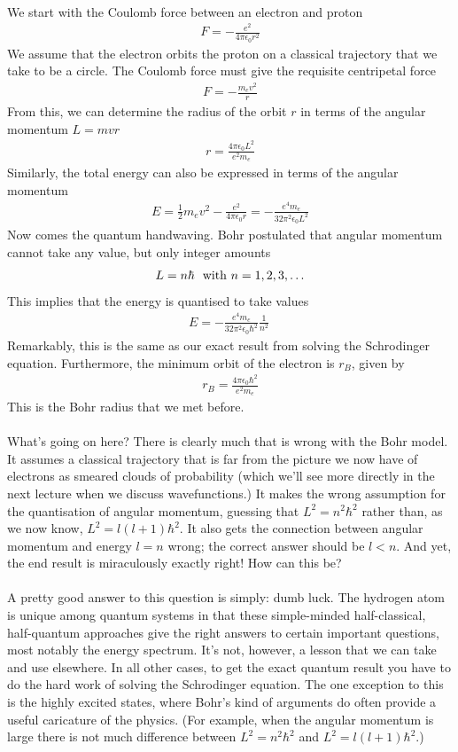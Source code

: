 \documentclass[12pt]{article}
\def\be{\begin{eqnarray}}
\def\ee{\end{eqnarray}}
\newcommand{\nn}{\nonumber}
\newcommand\para{\paragraph{}}
\newcommand{\co}{\color{olive}}
\begin{document}
{\para
{\co 
We start with the Coulomb force between an electron and proton
%
\be F = -\frac{e^2}{4\pi\epsilon_0 r^2}\nn\ee
%
}
We assume that the electron orbits the proton on a classical trajectory that we take to be a circle. {\co The Coulomb force must give the requisite centripetal force
%
\be F = -\frac{m_ev^2}{r}\nn\ee
%
From this, we can determine the radius of the orbit $r$ in terms of the angular momentum $L= mvr$ 
%
\be r= \frac{4\pi\epsilon_0 L^2}{e^2m_e} \nn\ee
%
Similarly, the total energy can also be expressed in terms of the angular momentum
%
\be E = \frac{1}{2}m_ev^2 - \frac{e^2}{4\pi\epsilon_0r} = -\frac{e^4m_e}{32\pi^2 \epsilon_0 L^2}\nn\ee
%
Now comes the quantum handwaving. Bohr postulated that angular momentum cannot take any value, but only integer amounts
%
\be L = n\hbar\ \ {\rm with}\  n=1,2,3,\ldots\nn\ee
%
This implies that the energy is quantised to take values
%
\be E = -\frac{e^4m_e}{32\pi^2\epsilon_0\hbar^2}\frac{1}{n^2}\ \nn\ee
%
}
Remarkably, this is the same as our exact result from solving the Schrodinger equation. {\co Furthermore, the minimum orbit of the electron is $r_B$, given by
%
\be r_B = \frac{4\pi \epsilon_0 \hbar^2}{e^2m_e}\nn\ee
%
This is the Bohr radius that we met before.}


\para
What's going on here? There is clearly much that is wrong with the Bohr model. It assumes a classical trajectory that  is far from the picture we now have of electrons as smeared clouds of probability (which we'll see more directly in the next lecture when we discuss wavefunctions.) It makes the wrong assumption for the quantisation of angular momentum, guessing that $L^2 = n^2\hbar^2$ rather than, as we now know, $L^2 = l(l+1)\hbar^2$. It also gets the connection between angular momentum and energy $l=n$ wrong; the correct answer should be $l<n$. And yet, the end result  is miraculously exactly right! How can this be?

\para
A pretty good answer to this question is simply: dumb luck. The hydrogen atom is unique among quantum systems in that these simple-minded half-classical, half-quantum approaches give the right answers to certain important questions, most notably the energy spectrum. It's not, however, a lesson that we can take and use elsewhere. In all other cases, to get the exact quantum result you have to do the hard work of solving the Schrodinger equation. The one exception to this is  the highly excited states, where Bohr's  kind of arguments do often provide a useful caricature of the physics. (For example, when the angular momentum is large there is not much difference between $L^2 = n^2\hbar^2$ and $L^2 = l(l+1)\hbar^2$.)


}
\end{document}
